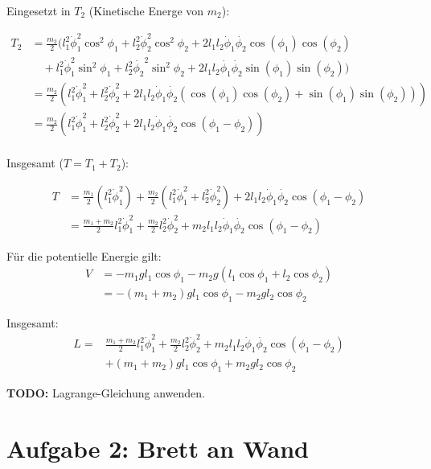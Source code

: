 \documentclass[a4paper,german,12pt,smallheadings]{scrartcl}
\begin{document}
Eingesetzt in $T_2$ (Kinetische Energe von $m_2$):

\begin{align*}
  T_2 &= \frac{m_2}{2} (l_1^2 \dot{\phi}_1^2 \cos^2 \phi_1 + l_2^2 \dot{\phi}_2^2 \cos^2 \phi_2 + 2l_1l_2\dot{\phi}_1\dot{\phi_2}\cos(\phi_1) \cos(\phi_2) \\
      &\quad + l_1^2 \dot{\phi}_1^2 \sin^2 \phi_1 + l_2^2 \dot{\phi_2}^2 \sin^2 \phi_2 + 2l_1l_2\dot{\phi_1}\dot{\phi_2}\sin(\phi_1)\sin(\phi_2)) \\
      &= \frac{m_2}{2} (l_1^2 \dot{\phi}_1^2 + l_2^2 \dot{\phi}_2^2 + 2l_1l_2\dot{\phi}_1\dot{\phi_2} (\cos(\phi_1) \cos(\phi_2) + \sin(\phi_1)\sin(\phi_2))) \\
      &= \frac{m_2}{2} (l_1^2 \dot{\phi}_1^2 + l_2^2 \dot{\phi}_2^2 + 2l_1l_2\dot{\phi}_1\dot{\phi_2} \cos(\phi_1 - \phi_2)) \\
\end{align*}

Insgesamt ($T = T_1 + T_2$):

\begin{align*}
  T &= \frac{m_1}{2} (l_1^2 \dot{\phi}_1^2) + \frac{m_2}{2} (l_1^2 \dot{\phi}_1^2 + l_2^2 \dot{\phi}_2^2) + 2l_1l_2\dot{\phi}_1\dot{\phi_2} \cos(\phi_1 - \phi_2) \\
    &= \frac{m_1 + m_2}{2} l_1^2 \dot{\phi}_1^2 + \frac{m_2}{2} l_2^2 \dot{\phi}_2^2 + m_2l_1l_2\dot{\phi}_1\dot{\phi_2} \cos(\phi_1 - \phi_2)
\end{align*}

Für die potentielle Energie gilt:
\begin{align*}
  V &= -m_1gl_1 \cos \phi_1 - m_2g(l_1 \cos \phi_1 + l_2 \cos \phi_2) \\
    &= -(m_1 + m_2)gl_1 \cos \phi_1 - m_2gl_2 \cos \phi_2
\end{align*}

Insgesamt:
\begin{align*}
  L = &\frac{m_1 + m_2}{2} l_1^2 \dot{\phi}_1^2 + \frac{m_2}{2} l_2^2 \dot{\phi}_2^2 + m_2l_1l_2\dot{\phi}_1\dot{\phi_2} \cos(\phi_1 - \phi_2) \\
      &+(m_1 + m_2)gl_1 \cos \phi_1 + m_2gl_2 \cos \phi_2
\end{align*}

\textbf{TODO:} Lagrange-Gleichung anwenden.

\section*{Aufgabe 2: Brett an Wand}
\end{document}
